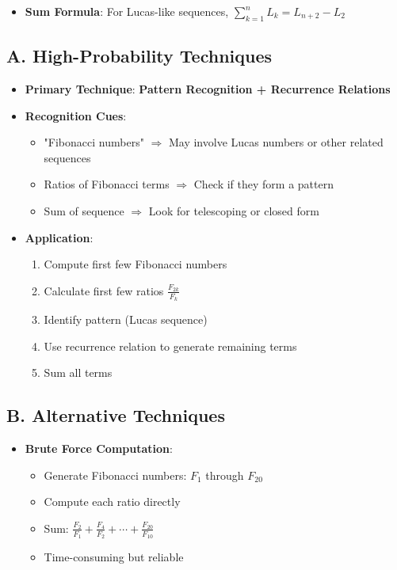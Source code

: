 \documentclass[12pt]{article}
\begin{document}
\begin{tacticalbox}
\begin{itemize}[leftmargin=*]
\begin{itemize}
        \item \textbf{Sum Formula}: For Lucas-like sequences, $\sum_{k=1}^{n} L_k = L_{n+2} - L_2$
    \end{itemize}
\end{itemize}
\end{tacticalbox}

\begin{techniquesbox}
\subsection*{A. High-Probability Techniques}
\begin{itemize}[leftmargin=*]
    \item \textbf{Primary Technique}: \textbf{Pattern Recognition + Recurrence Relations}
    
    \item \textbf{Recognition Cues}: 
    \begin{itemize}
        \item "Fibonacci numbers" $\Rightarrow$ May involve Lucas numbers or other related sequences
        \item Ratios of Fibonacci terms $\Rightarrow$ Check if they form a pattern
        \item Sum of sequence $\Rightarrow$ Look for telescoping or closed form
    \end{itemize}
    
    \item \textbf{Application}:
    \begin{enumerate}
        \item Compute first few Fibonacci numbers
        \item Calculate first few ratios $\frac{F_{2k}}{F_k}$
        \item Identify pattern (Lucas sequence)
        \item Use recurrence relation to generate remaining terms
        \item Sum all terms
    \end{enumerate}
\end{itemize}

\subsection*{B. Alternative Techniques}
\begin{itemize}[leftmargin=*]
    \item \textbf{Brute Force Computation}:
    \begin{itemize}
        \item Generate Fibonacci numbers: $F_1$ through $F_{20}$
        \item Compute each ratio directly
        \item Sum: $\frac{F_2}{F_1} + \frac{F_4}{F_2} + \cdots + \frac{F_{20}}{F_{10}}$
        \item Time-consuming but reliable
    \end{itemize}
    

\end{itemize}
\end{techniquesbox}
\end{document}
